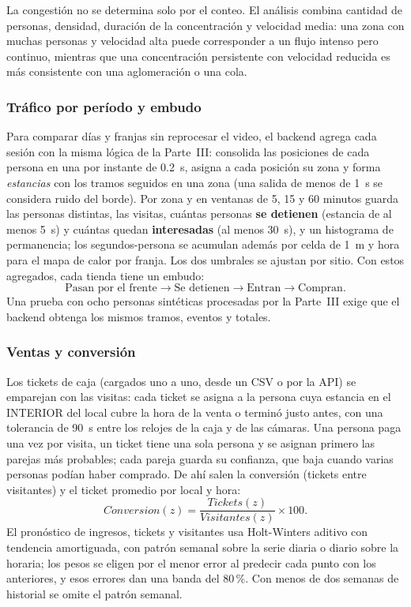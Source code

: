 \documentclass[12pt,a4paper]{article}
\begin{document}
La congestión no se determina solo por el conteo. El análisis combina
cantidad de personas, densidad, duración de la concentración y velocidad
media: una zona con muchas personas y velocidad alta puede corresponder a
un flujo intenso pero continuo, mientras que una concentración
persistente con velocidad reducida es más consistente con una
aglomeración o una cola.

\subsubsection{Tráfico por período y embudo}

Para comparar días y franjas sin reprocesar el video, el backend agrega cada
sesión con la misma lógica de la Parte~III: consolida las posiciones de cada
persona en una por instante de 0.2~s, asigna a cada posición su zona y forma
\textit{estancias} con los tramos seguidos en una zona (una salida de menos
de 1~s se considera ruido del borde). Por zona y en ventanas de 5, 15 y 60
minutos guarda las personas distintas, las visitas, cuántas personas
\textbf{se detienen} (estancia de al menos 5~s) y cuántas quedan
\textbf{interesadas} (al menos 30~s), y un histograma de permanencia; los
segundos-persona se acumulan además por celda de 1~m y hora para el mapa de
calor por franja. Los dos umbrales se ajustan por sitio. Con estos agregados,
cada tienda tiene un embudo:
\begin{equation}
\text{Pasan por el frente} \rightarrow \text{Se detienen} \rightarrow
\text{Entran} \rightarrow \text{Compran}.
\end{equation}
Una prueba con ocho personas sintéticas procesadas por la Parte~III exige que
el backend obtenga los mismos tramos, eventos y totales.

\subsubsection{Ventas y conversión}

Los tickets de caja (cargados uno a uno, desde un CSV o por la API) se
emparejan con las visitas: cada ticket se asigna a la persona cuya estancia en
el INTERIOR del local cubre la hora de la venta o terminó justo antes, con una
tolerancia de 90~s entre los relojes de la caja y de las cámaras. Una persona
paga una vez por visita, un ticket tiene una sola persona y se asignan primero
las parejas más probables; cada pareja guarda su confianza, que baja cuando
varias personas podían haber comprado. De ahí salen la conversión
(tickets entre visitantes) y el ticket promedio por local y hora:
\begin{equation}
Conversion(z)=\frac{Tickets(z)}{Visitantes(z)}\times100.
\end{equation}
El pronóstico de ingresos, tickets y visitantes usa Holt-Winters aditivo con
tendencia amortiguada, con patrón semanal sobre la serie diaria o diario sobre
la horaria; los pesos se eligen por el menor error al predecir cada punto con
los anteriores, y esos errores dan una banda del 80\,\%. Con menos de dos
semanas de historial se omite el patrón semanal.
\end{document}
